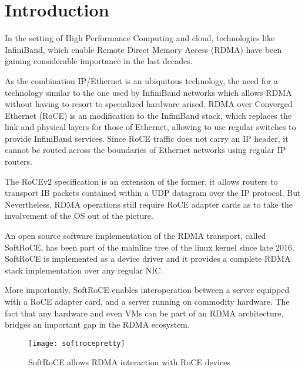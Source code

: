 \section{Introduction}

In the setting of High Performance Computing and cloud, technologies like InfiniBand, which enable Remote Direct Memory Access
(RDMA) have been gaining considerable importance in the last decades.

As the combination IP/Ethernet is an ubiquitous technology, the need for a technology similar
to the one used by InfiniBand networks which allows
RDMA without having to resort to specialized hardware arised. RDMA over Converged Ethernet (RoCE) is an modification
to the InfiniBand stack, which replaces the link and physical layers for those of Ethernet,
allowing to use regular switches to provide InfiniBand services. Since  RoCE traffic does not carry an IP header,
it cannot be routed across the boundaries of Ethernet networks using regular IP routers\cite{rocev2}.

The RoCEv2 specification is an extension of the former, it allows routers to transport
IB packets contained within a UDP datagram over the IP protocol. But Nevertheless, RDMA operations still require RoCE adapter
cards as to take the involvement of the OS out of the picture.

An open source software implementation of the RDMA transport, called SoftRoCE, has been part of the mainline tree of
the linux kernel since late 2016. SoftRoCE is implemented as a device driver and it provides a complete RDMA
stack implementation over any regular NIC\cite{softroce}.

More importantly, SoftRoCE enables interoperation between a server equipped with a RoCE adapter card, and a server running on
commodity hardware. The fact that any hardware and even VMs can be part of an RDMA architecture, bridges an important gap in the RDMA ecosystem.

\begin{figure}[h]
  \centering
  \texttt{[image: softrocepretty]}
  \caption[softroce]{SoftRoCE allows RDMA interaction with RoCE devices\footnotemark}
\end{figure}

